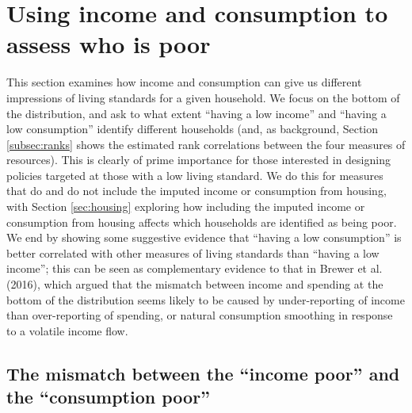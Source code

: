 \section{Using income and consumption to assess who is poor}\label{sec:composition}



This section examines how income and consumption can give us different impressions of living standards for a given household.  We focus on the bottom of the distribution, and ask to what extent ``having a low income'' and ``having a low consumption'' identify different households (and, as background, Section \ref{subsec:ranks} shows the estimated rank correlations between the four measures of resources). This is clearly of prime importance for those interested in designing policies targeted at those with a low living standard. We do this for measures that do and do not include the imputed income or consumption from housing, with Section \ref{sec:housing} exploring how including the imputed income or consumption from housing affects which households are identified as being poor. We end by showing some suggestive evidence that ``having a low consumption'' is better correlated with other measures of living standards than ``having a low income''; this can be seen as complementary evidence to that in Brewer et al. (2016), which argued that the mismatch between income and spending at the bottom of the distribution seems likely to be caused by under-reporting of income than over-reporting of spending, or natural consumption smoothing in response to a volatile income flow. 


\subsection{The mismatch between the ``income poor'' and the ``consumption poor''}\label{subsec:mismatch}

